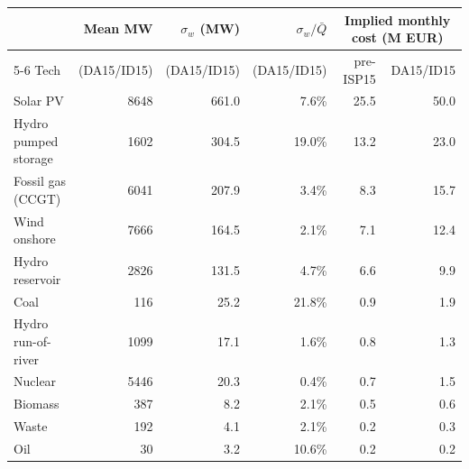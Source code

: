 \begin{tabular}{l r r r r r}
\toprule
 & \textbf{Mean MW} & \textbf{$\sigma_{w}$ (MW)} & \textbf{$\sigma_{w}/\bar{Q}$} & \multicolumn{2}{c}{\textbf{Implied monthly cost (M EUR)}} \\
\cmidrule(lr){5-6}
Tech & (DA15/ID15) & (DA15/ID15) & (DA15/ID15) & pre-ISP15 & DA15/ID15 \\
\midrule
Solar PV & 8648 & 661.0 & 7.6\% & 25.5 & 50.0 \\
Hydro pumped storage & 1602 & 304.5 & 19.0\% & 13.2 & 23.0 \\
Fossil gas (CCGT) & 6041 & 207.9 & 3.4\% & 8.3 & 15.7 \\
Wind onshore & 7666 & 164.5 & 2.1\% & 7.1 & 12.4 \\
Hydro reservoir & 2826 & 131.5 & 4.7\% & 6.6 & 9.9 \\
Coal & 116 & 25.2 & 21.8\% & 0.9 & 1.9 \\
Hydro run-of-river & 1099 & 17.1 & 1.6\% & 0.8 & 1.3 \\
Nuclear & 5446 & 20.3 & 0.4\% & 0.7 & 1.5 \\
Biomass & 387 & 8.2 & 2.1\% & 0.5 & 0.6 \\
Waste & 192 & 4.1 & 2.1\% & 0.2 & 0.3 \\
Oil & 30 & 3.2 & 10.6\% & 0.2 & 0.2 \\
\bottomrule
\end{tabular}
